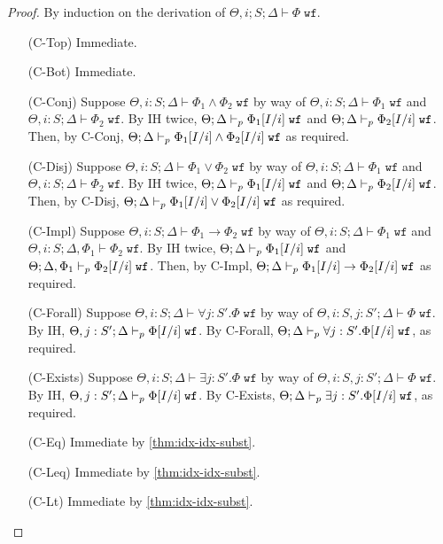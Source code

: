 \begin{proof}
By induction on the derivation of $\Theta, i ; S ; \Delta \vdash \Phi \; \texttt{wf}$.
\begin{enumerate}
  \item[(C-Top)] Immediate.
  \item[(C-Bot)] Immediate.
  \item[(C-Conj)] Suppose $\Theta, i : S ; \Delta \vdash \Phi_1 \wedge \Phi_2 \; \texttt{wf}$ by way of
  $\Theta, i : S ; \Delta \vdash \Phi_1 \; \texttt{wf}$ and
  $\Theta, i : S ; \Delta \vdash \Phi_2 \; \texttt{wf}$.
  By IH twice,
  $\Theta; \Delta \vdash_p \Phi_1[I/i] \; \texttt{wf}$ and
  $\Theta; \Delta \vdash_p \Phi_2[I/i] \; \texttt{wf}$.
  Then, by C-Conj,
  $\Theta ; \Delta \vdash_p \Phi_1[I/i] \wedge \Phi_2[I/i] \; \texttt{wf}$
  as required.
  \item[(C-Disj)] Suppose $\Theta, i : S ; \Delta \vdash \Phi_1 \vee \Phi_2 \; \texttt{wf}$ by way of
  $\Theta, i : S ; \Delta \vdash \Phi_1 \; \texttt{wf}$ and
  $\Theta, i : S ; \Delta \vdash \Phi_2 \; \texttt{wf}$.
  By IH twice,
  $\Theta; \Delta \vdash_p \Phi_1[I/i] \; \texttt{wf}$ and
  $\Theta; \Delta \vdash_p \Phi_2[I/i] \; \texttt{wf}$.
  Then, by C-Disj,
  $\Theta ; \Delta \vdash_p \Phi_1[I/i] \vee \Phi_2[I/i] \; \texttt{wf}$
  as required.
  
  \item[(C-Impl)]  Suppose $\Theta, i : S ; \Delta \vdash \Phi_1 \to \Phi_2 \; \texttt{wf}$ by way of
  $\Theta, i : S ; \Delta \vdash \Phi_1 \; \texttt{wf}$ and
  $\Theta, i : S ; \Delta, \Phi_1 \vdash \Phi_2 \; \texttt{wf}$.
  By IH twice,
  $\Theta; \Delta \vdash_p \Phi_1[I/i] \; \texttt{wf}$ and
  $\Theta; \Delta, \Phi_1 \vdash_p \Phi_2[I/i] \; \texttt{wf}$.
  Then, by C-Impl,
  $\Theta ; \Delta \vdash_p \Phi_1[I/i] \to \Phi_2[I/i] \; \texttt{wf}$
  as required.
  
  \item[(C-Forall)] Suppose $\Theta, i : S ; \Delta \vdash \forall j : S'. \Phi \; \texttt{wf}$ by way of
  $\Theta, i : S, j : S' ; \Delta \vdash\Phi \; \texttt{wf}$.
  By IH,
  $\Theta, j : S' ; \Delta \vdash_p \Phi[I/i] \; \texttt{wf}$.
  By C-Forall,
  $\Theta;\Delta \vdash_p \forall j : S'. \Phi[I/i] \; \texttt{wf}$, as required.
  
  \item[(C-Exists)] Suppose $\Theta, i : S ; \Delta \vdash \exists j : S'. \Phi \; \texttt{wf}$ by way of
  $\Theta, i : S, j : S' ; \Delta \vdash\Phi \; \texttt{wf}$.
  By IH,
  $\Theta, j : S' ; \Delta \vdash_p \Phi[I/i] \; \texttt{wf}$.
  By C-Exists,
  $\Theta;\Delta \vdash_p \exists j : S'. \Phi[I/i] \; \texttt{wf}$, as required.
  
  \item[(C-Eq)] Immediate by \autoref{thm:idx-idx-subst}.
  \item[(C-Leq)] Immediate by \autoref{thm:idx-idx-subst}.
  \item[(C-Lt)] Immediate by \autoref{thm:idx-idx-subst}.
\end{enumerate}
\end{proof}